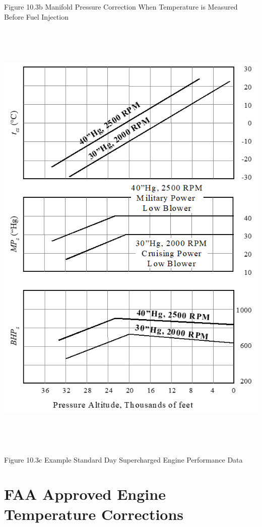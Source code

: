 \documentclass[
]{book}
\begin{document}
Figure 10.3b Manifold Pressure Correction When Temperature is Measured Before Fuel Injection

\includegraphics[width=6.24931in,height=8.62361in]{media/10/image24.png}

Figure 10.3c Example Standard Day Supercharged Engine Performance Data

\hypertarget{faa-approved-engine-temperature-corrections}{%
\section{FAA Approved Engine Temperature Corrections}\label{faa-approved-engine-temperature-corrections}}
\end{document}
